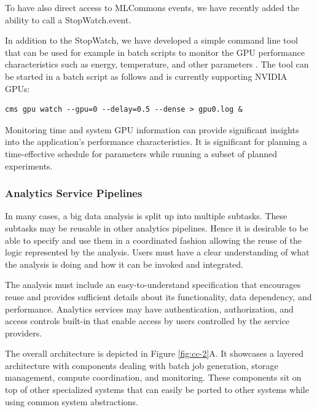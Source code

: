\documentclass[utf8]{FrontiersinVancouver} %
\begin{document}
To have also direct access to MLCommons events, we have recently added the ability to call a StopWatch.event.


In addition to the StopWatch, we have developed a simple command line tool that can be used for example in batch scripts to monitor the GPU performance characteristics such as energy, temperature, and other parameters \citep{cloudmesh-gpu}. The tool can be started in a batch script as follows and is currently supporting NVIDIA GPUs:

{\fontsize{6pt}{6pt}\selectfont
\begin{lstlisting}[style=sh]
    cms gpu watch --gpu=0 --delay=0.5 --dense > gpu0.log &
\end{lstlisting}
}


Monitoring time and system GPU information can provide significant insights into the application's performance characteristics. It is significant for planning a time-effective schedule for parameters while running a subset of planned experiments.


\subsubsection{Analytics Service Pipelines}

In many cases, a big data analysis is split up into multiple subtasks. These subtasks may be reusable in other analytics pipelines. Hence it is desirable to be able to specify and use them in a coordinated fashion allowing the reuse of the logic represented by the analysis. Users must have a clear understanding of what the analysis is doing and how it can be invoked and integrated.

The analysis must include an easy-to-understand specification that encourages reuse and provides sufficient details about its functionality, data dependency, and performance. Analytics services may have authentication, authorization, and access controls built-in that enable access by users controlled by the service providers.

The overall architecture is depicted in Figure \ref{fig:cc-2}A. It showcases a layered architecture with components dealing with batch job generation, storage management, compute coordination, and monitoring. These components sit on top of other specialized systems that can easily be ported to other systems while using common system abstractions.
\end{document}
